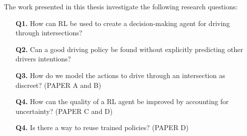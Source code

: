 
The work presented in this thesis investigate the following research questions:
\begin{enumerate}
	\item[\textbf{Q1.}] How can RL be used to create a decision-making agent for driving through intersections?
	\item[\textbf{Q2.}] Can a good driving policy be found without explicitly predicting other drivers intentions?
	\item[\textbf{Q3.}] How do we model the actions to drive through an intersection as discreet? (PAPER A and B)
	\item[\textbf{Q4.}] How can the quality of a RL agent be improved by accounting for uncertainty? (PAPER C and D)
	\item[\textbf{Q4.}] Is there a way to reuse trained policies? (PAPER D)

\end{enumerate}

